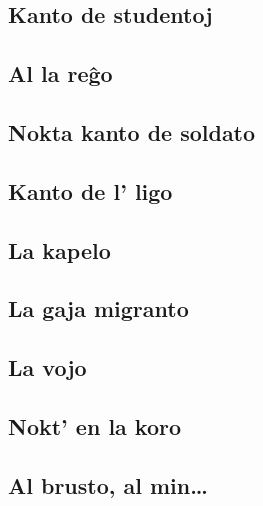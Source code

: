 \documentclass[a5paper,11pt,openany,twoside]{book}
\begin{document}
\subsection{Kanto de studentoj}
\label{studentoj}


\subsection{Al la re\^go}
\label{regxo}


\subsection{Nokta kanto de soldato}
\label{soldato}


\subsection{Kanto de l' ligo}
\label{ligo}


\subsection{La kapelo}
\label{kapelo}


\subsection{La gaja migranto}
\label{migranto}


\subsection{La vojo}
\label{lavojo2}



\subsection{Nokt' en la koro}
\label{noktenlakoro}


\subsection{Al brusto, al min\dots}
\label{albrusto}


\end{document}
